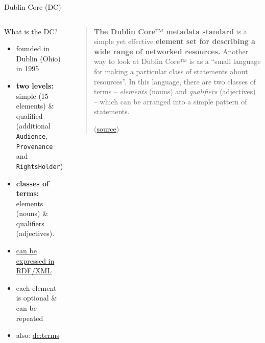 \begin{frame}{Dublin Core (DC)}

\begin{columns}
\begin{block}{What is the DC?}
\begin{itemize}\footnotesize
    \item founded in Dublin (Ohio) in 1995
    \item \textbf{two levels:} simple (15 elements) \& qualified (additional \texttt{Audience}, \texttt{Provenance} and \texttt{RightsHolder})
    \item \textbf{classes of terms:} elements (nouns) \& qualifiers (adjectives).
    \item \href{https://www.dublincore.org/specifications/dublin-core/dcmes-xml/}{can be expressed in RDF/XML}
    \item each element is optional \& can be repeated
    \item also: \href{https://www.dublincore.org/specifications/dublin-core/dcmi-terms/}{dc:terms}
\end{itemize}
\end{block}

\begin{block}{}
\begin{quote}
    \textbf{The Dublin Core™ metadata standard} is a simple yet effective\textbf{ element set for describing a wide range of networked resources.} \punkti 
    Another way to look at Dublin Core™ is as a ``small language for making a particular class of statements about resources''. In this language, there are two classes of terms -- \textit{elements} (nouns) and \textit{qualifiers} (adjectives) -- which can be arranged into a simple pattern of statements. 
    
    (\href{https://www.dublincore.org/specifications/dublin-core/usageguide/#whatis}{source})
\end{quote}
\end{block}
\end{columns}

\framebreak

\begin{columns}


\end{columns}
\end{frame}
